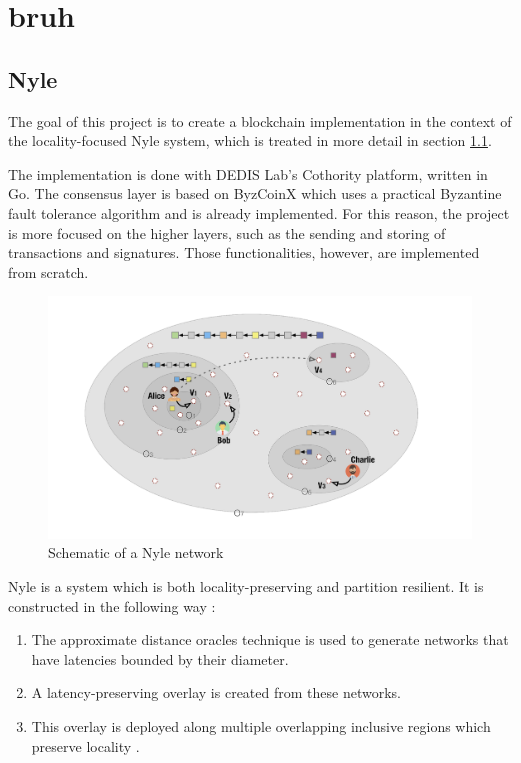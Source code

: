 \documentclass[11pt, a4paper, twoside, openright]{article}
\begin{document}
\newpage
\section{bruh}
\subsection{Nyle}
\label{Nyle}



The goal of this project is to create a blockchain implementation in the context of the locality-focused Nyle system, which is treated in more detail in section \ref{Nyle}.

The implementation is done with DEDIS Lab's Cothority platform, written in Go. The consensus layer is based on ByzCoinX \cite{webassembly} which uses a practical Byzantine fault tolerance algorithm \cite{castro1999practical} and is already implemented. For this reason, the project is more focused on the higher layers, such as the sending and storing of transactions and signatures. Those functionalities, however, are implemented from scratch. 

\begin{figure}[htbp]
 \centering
  \includegraphics[width=12cm]{nyle.png}
  \caption{Schematic of a Nyle network}
\end{figure}

Nyle is a system which is both locality-preserving and partition resilient. It is constructed in the following way :

\begin{enumerate} 

\itemsep0em

 \item The approximate distance oracles technique \cite{thorup2005approximate} is used to generate networks that have latencies bounded by their diameter.
 \item A latency-preserving overlay is created from these networks.
 \item This overlay is deployed along multiple overlapping inclusive regions which preserve locality \cite{basescu2014crux}.

\end{enumerate}
\end{document}
